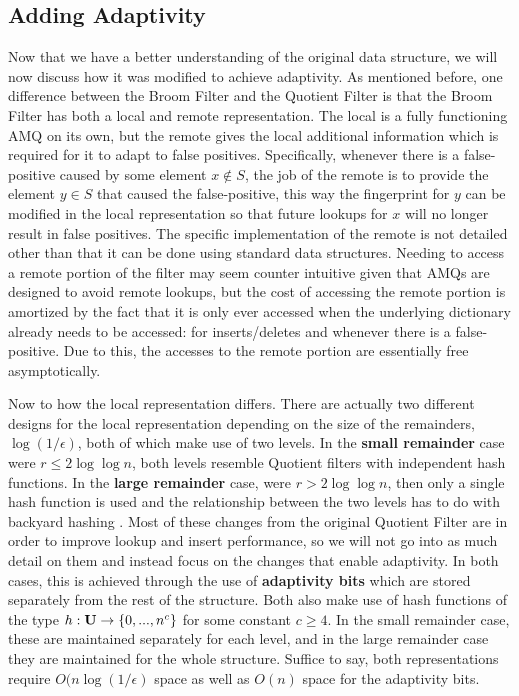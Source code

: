 \documentclass[../paper.tex]{subfiles}
\begin{document}
\subsection{Adding Adaptivity}
	Now that we have a better understanding of the original data structure, we will now discuss how it was modified to achieve adaptivity.  As mentioned before, one difference between the Broom Filter and the Quotient Filter is that the Broom Filter has both a local and remote representation.  The local is a fully functioning AMQ on its own, but the remote gives the local additional information which is required for it to adapt to false positives.  Specifically, whenever there is a false-positive caused by some element $x \notin S$, the job of the remote is to provide the element $y \in S$ that caused the false-positive, this way the fingerprint for $y$ can be modified in the local representation so that future lookups for $x$ will no longer result in false positives.  The specific implementation of the remote is not detailed other than that it can be done using standard data structures.  Needing to access a remote portion of the filter may seem counter intuitive given that AMQs are designed to avoid remote lookups, but the cost of accessing the remote portion is amortized by the fact that it is only ever accessed when the underlying dictionary already needs to be accessed: for inserts/deletes and whenever there is a false-positive.  Due to this, the accesses to the remote portion are essentially free asymptotically.
	
	Now to how the local representation differs.  There are actually two different designs for the local representation depending on the size of the remainders, $\log(1/\epsilon)$, both of which make use of two levels.   In the {\bf small remainder} case were $r \leq 2 \log\log n$, both levels resemble Quotient filters with independent hash functions.  In the {\bf  large remainder} case, were $ r > 2 \log\log n$, then only a single hash function is used and the relationship between the two levels has to do with backyard hashing \cite{backyard-hashing}.  Most of these changes from the original Quotient Filter are in order to improve lookup and insert performance, so we will not go into as much detail on them and instead focus on the changes that enable adaptivity.  In both cases, this is achieved through the use of {\bf adaptivity bits} which are stored separately from the rest of the structure.  Both also make use of hash functions of the type $h : {\bf U} \rightarrow \{0, ..., n^c\}$ for some constant $c \geq 4$.  In the small remainder case, these are maintained separately for each level, and in the large remainder case they are maintained for the whole structure.  Suffice to say, both representations require $O(n\log(1/\epsilon)$ space as well as $O(n)$ space for the adaptivity bits.  
	
\end{document}
